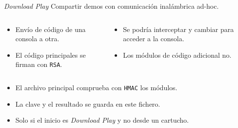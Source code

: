 \begin{frame}{\textit{Download Play}}
Compartir demos con comunicación inalámbrica ad-hoc.

\begin{columns}
    \begin{column}{0.5\textwidth}
    \begin{itemize}
        \item<3-> Envío de código de una consola a otra.
        \item<5-> El código principales se firman con \texttt{RSA}.
    \end{itemize}
    \end{column}

    \begin{column}{0.5\textwidth}
    \begin{itemize}
        \item<4-> Se podría interceptar y cambiar para acceder a la consola.
        \item<6-> Los módulos de código adicional no.
    \end{itemize}
    \end{column}
\end{columns}

\begin{itemize}
    \item<8-> El archivo principal comprueba con \texttt{HMAC} los módulos.
    \item<9-> La clave y el resultado se guarda en este fichero.
    \item<10-> Solo si el inicio es \textit{Download Play} y no desde un cartucho.
\end{itemize}
\end{frame}
